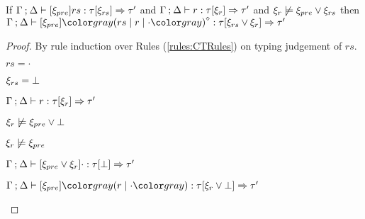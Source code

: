 \begin{lem}
  \label{lem:rule-append}
  If $\Gamma \mathbin{;} \Delta \vdash [\xi_{pre}] rs : \tau [\xi_{rs}] \Rightarrow \tau'$ and $\Gamma \mathbin{;} \Delta \vdash r : \tau [\xi_r] \Rightarrow \tau'$ and $\xi_r \not\models \xi_{pre} \vee \xi_{rs}$ then $\chrulstyp{\Gamma}{\Delta}{\xi_{pre}}{\rmpointer{\zruls{rs}{r}{\cdot}}}{\tau}{\cor{\xi_{rs}}{\xi_r}}{\tau'}$
\end{lem}
\begin{proof}
  By rule induction over Rules (\ref{rules:CTRules}) on typing judgement of $rs$.
  \begin{byCases}
  \item[\text{(\ref{rule:CTZeroRule})}]
    \begin{pfsteps*}
    \item $rs = \cdot$ 
    \item $\xi_{rs} = \bot$ 
    \item $\Gamma \mathbin{;} \Delta \vdash r : \tau [\xi_r] \Rightarrow \tau'$  
    \item $\xi_r \not\models \xi_{pre} \vee \bot$  
    \item $\xi_r \not\models \xi_{pre}$  
    \item $\Gamma \mathbin{;} \Delta \vdash [\xi_{pre} \vee \xi_r] \cdot : \tau [\bot] \Rightarrow \tau'$  
    \item $\chrulstyp{\Gamma}{\Delta}{\xi_{pre}}{\hrulesP{r}{\cdot}}{\tau}{\cor{\xi_r}{\cfalsity}}{\tau'}$ 
    \end{pfsteps*}

  \resetpfcounter


\end{byCases}
\end{proof}
